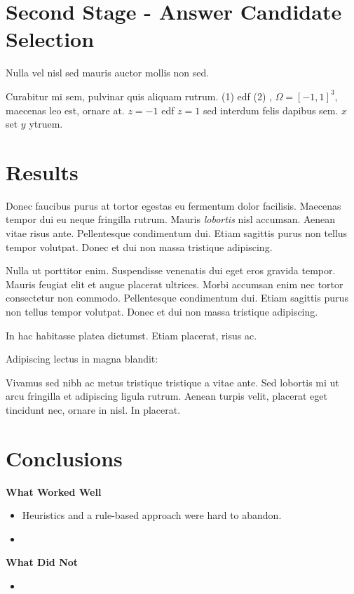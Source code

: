 \documentclass[a1,landscape]{a0poster}
\begin{document}
\begin{multicols}{3}

\section*{\LARGE Second Stage - Answer Candidate Selection}

Nulla vel nisl sed mauris auctor mollis non sed. 

Curabitur mi sem, pulvinar quis aliquam rutrum. (1) edf (2)
, $\Omega=[-1,1]^3$, maecenas leo est, ornare at. $z=-1$ edf $z=1$ sed interdum felis dapibus sem. $x$ set $y$ ytruem. 


\section*{\LARGE Results}

Donec faucibus purus at tortor egestas eu fermentum dolor facilisis. Maecenas tempor dui eu neque fringilla rutrum. Mauris \emph{lobortis} nisl accumsan. Aenean vitae risus ante. Pellentesque condimentum dui. Etiam sagittis purus non tellus tempor volutpat. Donec et dui non massa tristique adipiscing.


Nulla ut porttitor enim. Suspendisse venenatis dui eget eros gravida tempor. Mauris feugiat elit et augue placerat ultrices. Morbi accumsan enim nec tortor consectetur non commodo. Pellentesque condimentum dui. Etiam sagittis purus non tellus tempor volutpat. Donec et dui non massa tristique adipiscing. 

In hac habitasse platea dictumst. Etiam placerat, risus ac.

Adipiscing lectus in magna blandit:

Vivamus sed nibh ac metus tristique tristique a vitae ante. Sed lobortis mi ut arcu fringilla et adipiscing ligula rutrum. Aenean turpis velit, placerat eget tincidunt nec, ornare in nisl. In placerat.


\color{SaddleBrown} %

\section*{\LARGE Conclusions}
\textbf{What Worked Well}
\begin{itemize}
    \item Heuristics and a rule-based approach were hard to abandon.
    \item 
\end{itemize}
\vspace{0.7em}
\textbf{What Did Not}
\begin{itemize}
    \item 
\end{itemize}


\end{multicols}
\end{document}
